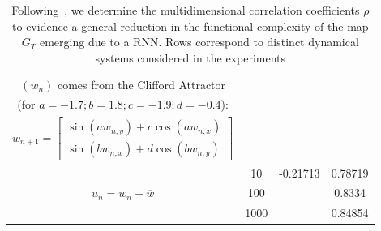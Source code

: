 \begin{center}
\begin{table}
{\begin{tabular}{|c|c| c c |}
          
               \midrule  
               $(w_n)$ comes from the Clifford Attractor \\ (for $a = -1.7; b = 1.8; c = -1.9; d = -0.4$): & & & \\
        {$w_{n+1}= \begin{bmatrix} \sin(aw_{n,y}) + c\cos(aw_{n,x}) \\ 
                                                                    \sin(bw_{n,x})+d\cos(bw_{n,y}) \end{bmatrix}$} & & & \\
          \multirow{3}{*}{$u_n = w_n-\overline{w}$}
              & 10 & -0.21713 & 0.78719 \\
              & 100 & &  0.8334 \\
              & 1000 & & 0.84854 \\
           \bottomrule
                \end{tabular}} %
 \caption{Following~\cite{manjunath2021universal}, we determine the multidimensional correlation coefficients $\rho$ to evidence a general reduction in the functional complexity of the map $G_T$ emerging due to a RNN. Rows correspond to distinct dynamical systems considered in the experiments
}
\end{table}
\end{center}
